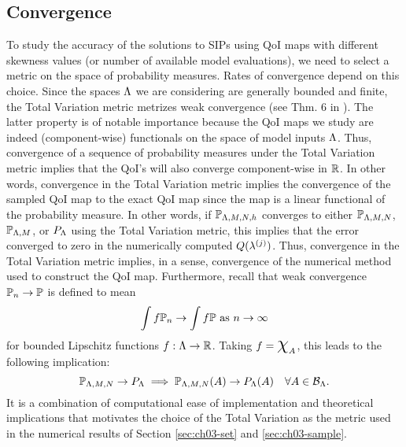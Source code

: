\subsection{Convergence}
To study the accuracy of the solutions to SIPs using QoI maps with different skewness values (or number of available model evaluations), we need to select a metric on the space of probability measures.
Rates of convergence depend on this choice.
Since the spaces ${\Lambda}$ we are considering are generally bounded and finite, the Total Variation metric metrizes weak convergence (see Thm. 6 in \cite{GS02}).
The latter property is of notable importance because the QoI maps we study are indeed (component-wise) functionals on the space of model inputs ${\Lambda}$.
Thus, convergence of a sequence of probability measures under the Total Variation metric implies that the QoI's will also converge component-wise in $\mathbb{R}$.
In other words, convergence in the Total Variation metric implies the convergence of the sampled QoI map to the exact QoI map since the map is a linear functional of the probability measure.
In other words, if $\mathbb{P}_{{\Lambda},M,N,h}$ converges to either $\mathbb{P}_{{\Lambda},M,N}$, $\mathbb{P}_{{\Lambda},M}$, or $P_{\Lambda}$ using the Total Variation metric, this implies that the error converged to zero in the numerically computed $Q(\lambda^{(j)})$.
Thus, convergence in the Total Variation metric implies, in a sense, convergence of the numerical method used to construct the QoI map.
Furthermore, recall that weak convergence $\mathbb{P}_n \to \mathbb{P}$ is defined to mean
\[
\int f \mathbb{P}_n \to \int f \mathbb{P} \text{ as } n \to \infty
\]
for bounded Lipschitz functions $f:{\Lambda}\to\mathbb{R}$.
Taking $f = \Chi_A$, this leads to the following implication:
\[
\mathbb{P}_{{\Lambda}, M, N} \to P_{\Lambda} \implies \mathbb{P}_{{\Lambda}, M, N} (A) \to P_{\Lambda} (A) \quad \forall{A\in\mathcal{B}_{{\Lambda}}}.
\]
It is a combination of computational ease of implementation and theoretical implications that motivates the choice of the Total Variation as the metric used in the numerical results of Section \ref{sec:ch03-set} and \ref{sec:ch03-sample}.


